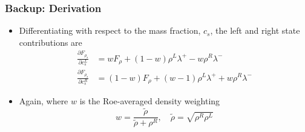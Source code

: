 \documentclass{beamer}
\begin{document}
\begin{frame}
  \frametitle{Backup: Derivation}
  \begin{itemize}
    \item Differentiating with respect to the mass fraction, $c_s$, the left and
      right state contributions are
    \begin{align*} \frac{\partial F_{\rho_s}}{\partial c^L_s} &=
      wF_\rho+(1-w)\rho^L\lambda^+ - w\rho^R\lambda^- \\ 
      \frac{\partial F_{\rho_s}}{\partial c^R_s} &=
      (1-w)F_\rho+(w-1)\rho^L\lambda^+ + w\rho^R\lambda^- 
    \end{align*}
  \item Again, where $w$ is the Roe-averaged density weighting
    \[
    	w = \frac{\tilde{\rho}}{\tilde{\rho}+\rho^R},\quad
    	\tilde{\rho} = \sqrt{\rho^R\rho^L}
    \]
  \end{itemize}
\end{frame}
\end{document}
